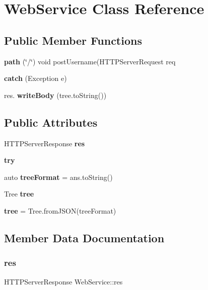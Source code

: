 \section{Web\+Service Class Reference}
\label{class_web_service}
\subsection*{Public Member Functions}
\begin{DoxyCompactItemize}
\item 
\mbox{\label{class_web_service_a32b7815ac1c25e07c9c94ce238c8011c}} 
{\bfseries path} (\char`\"{}/\char`\"{}) void post\+Username(H\+T\+T\+P\+Server\+Request req
\item 
\mbox{\label{class_web_service_a046f16bfdb43fee67ee16f5c4d7d4a3f}} 
{\bfseries catch} (Exception e)
\item 
\mbox{\label{class_web_service_a39d8a2047a659cea1059a92d9ec288d5}} 
res. {\bfseries write\+Body} (tree.\+to\+String())
\end{DoxyCompactItemize}
\subsection*{Public Attributes}
\begin{DoxyCompactItemize}
\item 
H\+T\+T\+P\+Server\+Response {\bfseries res}
\item 
{\bfseries try}
\item 
\mbox{\label{class_web_service_ad15fd5e269dbb73e51b998e0754fb3f7}} 
auto {\bfseries tree\+Format} = ans.\+to\+String()
\item 
\mbox{\label{class_web_service_ab33348661656c106a77131acebe0c935}} 
Tree {\bfseries tree}
\item 
\mbox{\label{class_web_service_a5417c52f948b66e5812c612bbad64a98}} 
{\bfseries tree} = Tree.\+from\+J\+S\+ON(tree\+Format)
\end{DoxyCompactItemize}


\subsection{Member Data Documentation}
\mbox{\label{class_web_service_a5ef409985df5ec38abec0bb2bc52fe36}} 
\subsubsection{res}
{\footnotesize\ttfamily H\+T\+T\+P\+Server\+Response Web\+Service\+::res}

